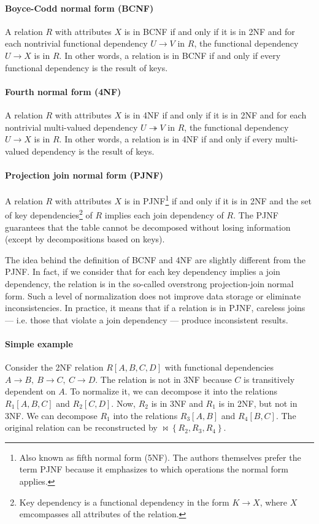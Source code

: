 \paragraph{Boyce-Codd normal form (BCNF)}  A relation $R$ with attributes $X$ is in BCNF
if and only if it is in 2NF and for each nontrivial functional dependency $U \to V$ in
$R$, the functional dependency $U \to X$ is in $R$.  In other words, a relation is in BCNF
if and only if every functional dependency is the result of keys.

\paragraph{Fourth normal form (4NF)}  A relation $R$ with attributes $X$ is in 4NF if
and only if it is in 2NF and for each nontrivial multi-valued dependency $U \twoheadrightarrow
V$ in $R$, the functional dependency $U \to X$ is in $R$.  In other words, a relation is
in 4NF if and only if every multi-valued dependency is the result of keys.

\paragraph{Projection join normal form (PJNF)} A relation $R$ with attributes $X$ is in
PJNF\footnote{Also known as fifth normal form (5NF).  The authors themselves prefer
the term PJNF because it emphasizes to which operations the normal form applies.}
if and only if it is in 2NF and
the set of key dependencies\footnote{Key dependency is a functional dependency in the form
$K \to X$, where $X$ emcompasses all attributes of the relation.} of $R$ implies each join
dependency of $R$.  The PJNF guarantees that the
table cannot be decomposed without losing information (except by decompositions based on
keys).

The idea behind the definition of BCNF and 4NF are slightly different from the
PJNF.  In fact, if we consider that for each key dependency implies a join dependency, the
relation is in the so-called overstrong projection-join normal
form.  Such a level of normalization does not improve data storage
or eliminate inconsistencies.  In practice, it means that if a relation is in PJNF,
careless joins --- i.e. those that violate a join dependency --- produce
inconsistent results.

\paragraph{Simple example}  Consider the 2NF relation $R[A, B, C, D]$ with functional
dependencies $A \to B,~B \to C,~C \to D$.  The relation is not in 3NF because $C$ is
transitively dependent on $A$.  To normalize it, we can decompose it into the
relations $R_1[A, B, C]$ and $R_2[C, D]$.  Now, $R_2$ is in 3NF and $R_1$ is in 2NF, but
not in 3NF.  We can decompose $R_1$ into the relations $R_3[A, B]$ and $R_4[B, C]$.
The original relation can be reconstructed by $\bowtie \left\{ R_2, R_3, R_4 \right\}$.

